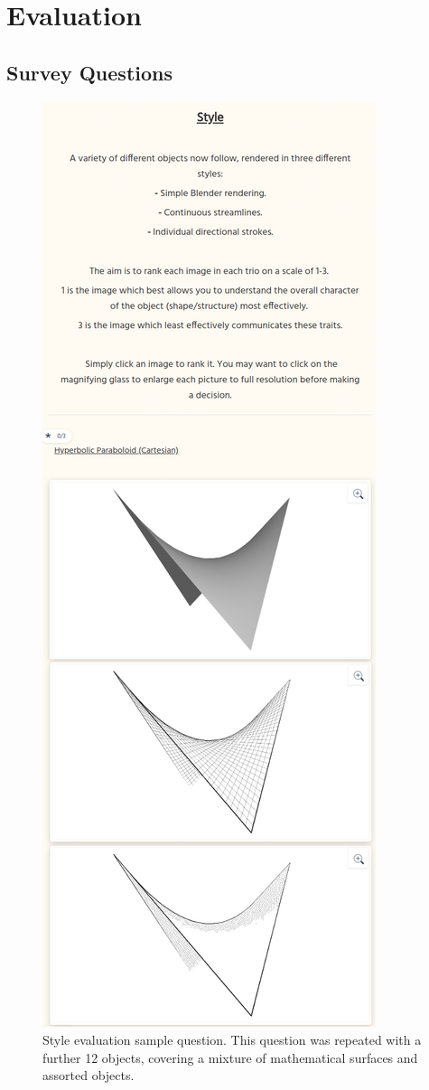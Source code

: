 \chapter{Evaluation}\label{appendix_evaluation}

\FloatBarrier
\section{Survey Questions}

\begin{figure}[h!]
	\centering
	\includegraphics[height=0.8\textheight]{images/eval_styles.png}
	\caption{Style evaluation sample question. This question was repeated with a further 12 objects, covering a mixture of mathematical surfaces and assorted objects.}\label{eval_styles}
\end{figure}

